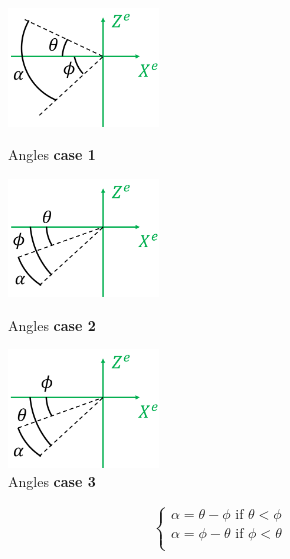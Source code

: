 \begin{figure}[!htb]
    \centering
    \begin{minipage}[b]{0.32\textwidth}
        \centering
        \includegraphics[width=4cm]{Figures/background/bet/angles-3.png}
        \caption[Angles case 1]{Angles \textbf{case 1}}
        \label{fig:ang-111}
    \end{minipage}
    \hfill
    \begin{minipage}[b]{0.32\textwidth}
        \centering
        \includegraphics[width=4cm]{Figures/background/bet/angles-1.png}
        \caption[Angles case 2]{Angles \textbf{case 2}}
        \label{fig:ang-222}
    \end{minipage}
    \hfill
    \begin{minipage}[b]{0.32\textwidth}
        \centering
        \includegraphics[width=4cm]{Figures/background/bet/angles-2.png}
        \caption[Angles case 3] {Angles \textbf{case 3}}
        \label{fig:ang-333}
    \end{minipage}
\end{figure}


\begin{equation}
    \begin{cases}
        \alpha = \theta - \phi \text{ if } \theta < \phi\\
        \alpha = \phi - \theta \text{ if } \phi < \theta\\
    \end{cases}
    \label{eq:angle_of_attack}
\end{equation}



